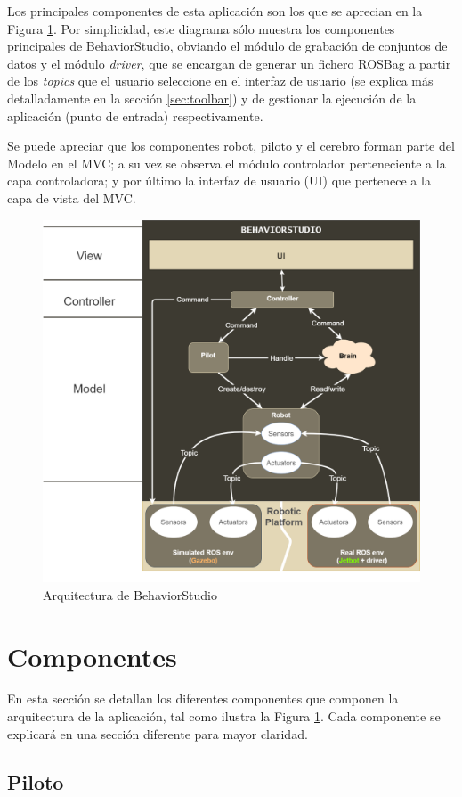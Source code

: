 Los principales componentes de esta aplicación son los que se aprecian en la Figura \ref{fig:architecture}. Por simplicidad, este diagrama sólo muestra los componentes principales de BehaviorStudio, obviando el módulo de grabación de conjuntos de datos y el módulo \textit{driver}, que se encargan de generar un fichero ROSBag a partir de los \textit{topics} que el usuario seleccione en el interfaz de usuario (se explica más detalladamente en la sección \ref{sec:toolbar}) y de gestionar la ejecución de la aplicación (punto de entrada) respectivamente.

Se puede apreciar que los componentes robot, piloto y el cerebro forman parte del Modelo en el MVC; a su vez se observa el módulo controlador perteneciente a la capa controladora; y por último la interfaz de usuario (UI) que pertenece a la capa de vista del MVC. 

\begin{figure}
  \centering
  \includegraphics[width=.7\linewidth]{img/arquitectura}
  \caption{Arquitectura de BehaviorStudio}
  \label{fig:architecture}
\end{figure}

\section{Componentes}
\label{sec:components}

En esta sección se detallan los diferentes componentes que componen la arquitectura de la aplicación, tal como ilustra la Figura \ref{fig:architecture}. Cada componente se explicará en una sección diferente para mayor claridad.

\subsection{Piloto}
\label{sec:pilot}

